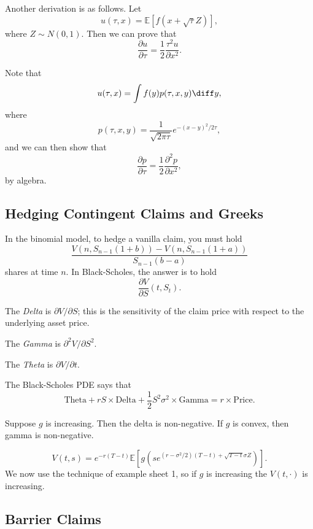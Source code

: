\documentclass[12pt]{article}
\begin{document}
Another derivation is as follows. Let
\[
u(\tau, x) = \mathbb{E}[f(x + \sqrt \tau Z)],
\]
where $Z \sim N(0, 1)$. Then we can prove that
\[
\frac{\partial u}{\partial \tau} = \frac{1}{2} \frac{\tau^2 u}{\partial x^2}.
\]

\begin{proofbox}
	Note that
	\[
	u(\tau, x) = \int f(y) p(\tau, x, y) \diff y,
	\]
	where
	\[
		p(\tau, x, y) = \frac{1}{\sqrt{2 \pi \tau}}e^{-(x-  y)^2/2\tau},
	\]
	and we can then show that
	\[
	\frac{\partial p}{\partial \tau}  = \frac{1}{2} \frac{\partial^2 p}{\partial x^2},
	\]
	by algebra.
\end{proofbox}

\subsection{Hedging Contingent Claims and Greeks}%
\label{sub:hedge_greeks}

In the binomial model, to hedge a vanilla claim, you must hold
\[
\frac{V(n, S_{n-1}(1 + b)) - V(n, S_{n-1}(1+a))}{S_{n-1}(b - a)}
\]
shares at time $n$. In Black-Scholes, the answer is to hold
\[
\frac{\partial V}{\partial S}(t, S_t).
\]

\begin{definition}
	The \emph{Delta} is $\partial V/\partial S$; this is the sensitivity of the claim price with respect to the underlying asset price.

	The \emph{Gamma} is $\partial^2 V/\partial S^2$.

	The \emph{Theta} is $\partial V/ \partial t$.
\end{definition}

The Black-Scholes PDE says that
\[
	\text{Theta} + rS \times \text{Delta} + \frac{1}{2} S^2 \sigma^2 \times \text{Gamma} = r \times \text{Price}.
\]

\begin{proposition}
	Suppose $g$ is increasing. Then the delta is non-negative. If $g$ is convex, then gamma is non-negative.
\end{proposition}

\begin{proofbox}
	\[
		V(t, s) = e^{-r(T - t)} \mathbb{E}[g(s e^{(r - \sigma^2/2)(T - t) + \sqrt{T - t} \sigma Z})].
	\]
	We now use the technique of example sheet 1, so if $g$ is increasing the $V(t, \cdot)$ is increasing.
\end{proofbox}

\subsection{Barrier Claims}%
\label{sub:barrier}
\end{document}
